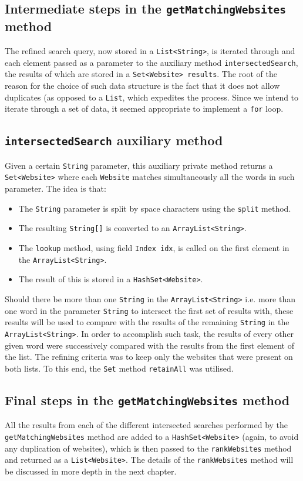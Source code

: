 \subsection{Intermediate steps in the {\tt getMatchingWebsites} method}
The refined search query, now stored in a {\tt List<String>}, is iterated through and each element passed as a parameter to the auxiliary method {\tt intersectedSearch}, the results of which are stored in a {\tt Set<Website> results}. The root of the reason for the choice of such data structure is the fact that it does not allow duplicates (as opposed to a {\tt List}, which expedites the process. Since we intend to iterate through a set of data, it seemed appropriate to implement a {\tt for} loop.
\subsection{{\tt intersectedSearch} auxiliary method}
Given a certain {\tt String} parameter, this auxiliary private method returns a {\tt Set<Website>} where each {\tt Website} matches simultaneously all the words in such parameter. The idea is that:
\begin{itemize}
\item The {\tt String} parameter is split by space characters using the {\tt split} method.
\item The resulting {\tt String[]} is converted to an {\tt ArrayList<String>}.
\item The {\tt lookup} method, using field {\tt Index idx}, is called on the first element in the {\tt ArrayList<String>}.
\item The result of this is stored in a {\tt HashSet<Website>}.
\end{itemize}
Should there be more than one {\tt String} in the {\tt ArrayList<String>} i.e. more than one word in the parameter {\tt String} to intersect the first set of results with, these results will be used to compare with the results of the remaining {\tt String} in the {\tt ArrayList<String>}. In order to accomplish such task, the results of every other given word were successively compared with the results from the first element of the list. The refining criteria was to keep only the websites that were present on both lists.
To this end, the {\tt Set} method {\tt retainAll} was utilised.
\subsection{Final steps in the {\tt getMatchingWebsites} method}
All the results from each of the different intersected searches performed by the {\tt getMatchingWebsites} method are added to a {\tt HashSet<Website>} (again, to avoid any duplication of websites), which is then passed to the {\tt rankWebsites} method and returned as a {\tt List<Website>}. The details of the {\tt rankWebsites} method will be discussed in more depth in the next chapter.

